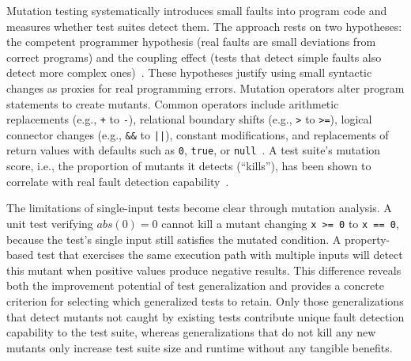 Mutation testing systematically introduces small faults into program code
and measures whether test suites detect them.
The approach rests on two hypotheses: the competent programmer hypothesis
(real faults are small deviations from correct programs) and the coupling effect
(tests that detect simple faults also detect more complex ones)~\cite{offutt_1992_investigations}.
These hypotheses justify using small syntactic changes as proxies for real programming errors.
Mutation operators alter program statements to create mutants.
Common operators include arithmetic replacements (e.g., \texttt{+} to \texttt{-}),
relational boundary shifts (e.g., \texttt{>} to \texttt{>=}),
logical connector changes (e.g., \texttt{\&\&} to \texttt{||}),
constant modifications, and replacements of return values with defaults
such as \texttt{0}, \texttt{true}, or \texttt{null}~\cite{jia_2011_analysis}.
A test suite's mutation score, i.e., the proportion of mutants it detects (``kills''),
has been shown to correlate with real fault detection capability~\cite{just_2014_mutants,papadakis_2019_mutation}.

The limitations of single-input tests become clear through mutation analysis.
A unit test verifying $abs(0) = 0$
cannot kill a mutant changing \texttt{x >= 0} to \texttt{x == 0},
because the test's single input still satisfies the mutated condition.
A property-based test
that exercises the same execution path with multiple inputs
will detect this mutant when positive values produce negative results.
This difference reveals both the improvement potential of test generalization
and provides a concrete criterion for selecting which generalized tests
to retain. Only those generalizations that detect mutants not caught by existing tests
contribute unique fault detection capability to the test suite,
whereas generalizations that do not kill any new mutants only increase test suite size and runtime
without any tangible benefits.
